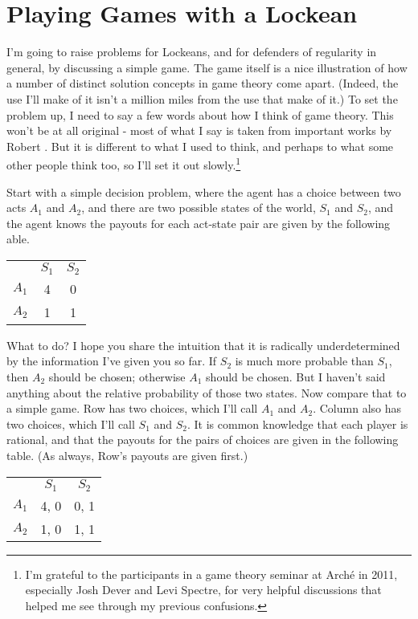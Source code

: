 \section{Playing Games with a Lockean}

I'm going to raise problems for Lockeans, and for defenders of regularity in general, by discussing a simple game. The game itself is a nice illustration of how a number of distinct solution concepts in game theory come apart. (Indeed, the use I'll make of it isn't a million miles from the use that  \cite{KohlbergMertens1986} make of it.) To set the problem up, I need to say a few words about how I think of game theory. This won't be at all original - most of what I say is taken from important works by Robert \cite{Stalnaker1994, Stalnaker1996, Stalnaker1998, Stalnaker1999}. But it is different to what I used to think, and perhaps to what some other people think too, so I'll set it out slowly.\footnote{I'm grateful to the participants in a game theory seminar at Arch\'e in 2011, especially Josh Dever and Levi Spectre, for very helpful discussions that helped me see through my previous confusions.}

Start with a simple decision problem, where the agent has a choice between two acts $A_1$ and $A_2$, and there are two possible states of the world, $S_1$ and $S_2$, and the agent knows the payouts for each act-state pair are given by the following able.

\begin{center}
\begin{tabular}{r c c}
 & $S_1$ & $S_2$ \\
$A_1$ & 4 & 0 \\
$A_2$ & 1 & 1 
\end{tabular}
\end{center}

\noindent What to do? I hope you share the intuition that it is radically underdetermined by the information I've given you so far. If $S_2$ is much more probable than $S_1$, then $A_2$ should be chosen; otherwise $A_1$ should be chosen. But I haven't said anything about the relative probability of those two states. Now compare that to a simple game. Row has two choices, which I'll call $A_1$ and $A_2$. Column also has two choices, which I'll call $S_1$ and $S_2$. It is common knowledge that each player is rational, and that the payouts for the pairs of choices are given in the following table. (As always, Row's payouts are given first.)

\begin{center}
\begin{tabular}{r c c}
 & $S_1$ & $S_2$ \\
$A_1$ & 4, 0 & 0, 1 \\
$A_2$ & 1, 0 & 1, 1 
\end{tabular}
\end{center}

